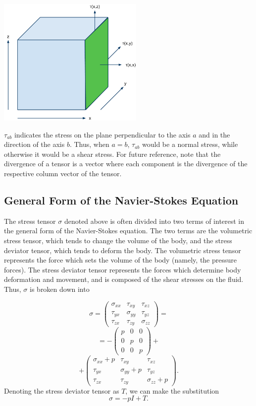 \documentclass[a4paper]{article}
\begin{document}
\begin{center}
    \includegraphics[width=200pt]{images/Stresses.gif}\\
\end{center}

$\tau_{ab}$ indicates the stress on the plane perpendicular to the axis $a$ and in the direction of the axis $b$. Thus, when $a=b$, $\tau_{ab}$ would be a normal stress, while otherwise it would be a shear stress. For future reference, note that the divergence of a tensor is a vector where each component is the divergence of the respective column vector of the tensor.

\subsection*{General Form of the Navier-Stokes Equation}

The stress tensor $\sigma$ denoted above is often divided into two terms of interest in the general form of the Navier-Stokes equation. The two terms are the volumetric stress tensor, which tends to change the volume of the body, and the stress deviator tensor, which tends to deform the body. The volumetric stress tensor represents the force which sets the volume of the body (namely, the pressure forces). The stress deviator tensor represents the forces which determine body deformation and movement, and is composed of the shear stresses on the fluid. Thus, $\sigma$ is broken down into

\[\sigma =  \left( \begin{array}{ccc}
    \sigma_{xx} &  \tau_{xy} & \tau_{xz} \\
\tau_{yx} &  \sigma_{yy} & \tau_{yz} \\
\tau_{zx} &  \tau_{zy} & \sigma_{zz}
\end{array} \right) = \] \[ = -\left( \begin{array}{ccc}
    p &  0 & 0 \\
0 &  p & 0 \\
0 &  0 & p 
\end{array} \right) +\]\[+ \left( \begin{array}{ccc}
    \sigma_{xx} + p &  \tau_{xy} & \tau_{xz} \\
\tau_{yx} &  \sigma_{yy} + p & \tau_{yz} \\
\tau_{zx} &  \tau_{zy} & \sigma_{zz} + p
\end{array} \right).\]
Denoting the stress deviator tensor as $T$, we can make the substitution
\[\sigma = -pI + T.\]\\
\end{document}
